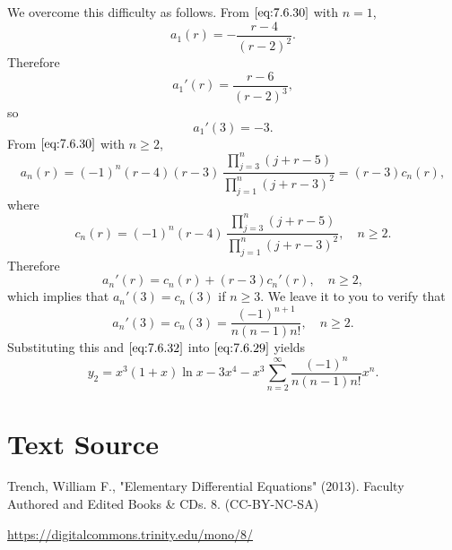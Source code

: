 \documentclass{ximera}
\begin{document}
\begin{example}
\begin{explanation}
We overcome this difficulty as follows. From $\eqref{eq:7.6.30}$ with
$n=1$,
$$
a_1(r)=-\frac{r-4}{(r-2)^2}.
$$
Therefore
$$
a_1'(r)=\frac{r-6}{(r-2)^3},
$$
so
\begin{equation} \label{eq:7.6.32}
a_1'(3)=-3.
\end{equation}
From $\eqref{eq:7.6.30}$ with $n\geq 2$,
$$
a_n(r)=(-1)^n (r-4)(r-3)\,\frac{\prod_{j=3}^n(j+r-5)}{\prod_{j=1}^n(j+r-3)^2}
=(r-3)c_n(r),
$$
where
$$
c_n(r)=(-1)^n(r-4)\,
\frac{\prod_{j=3}^n(j+r-5)}{\prod_{j=1}^n(j+r-3)^2},\quad  n\geq 2.
$$
Therefore
$$
a_n'(r)=c_n(r)+(r-3)c_n'(r),\quad n\geq 2,
$$
which implies that  $a_n'(3)=c_n(3)$ if $n\geq 3$. We leave it to
you to verify that
$$
a_n'(3)=c_n(3)=\frac{(-1)^{n+1}}{n(n-1)n!},\quad n\geq 2.
$$
Substituting this and $\eqref{eq:7.6.32}$ into $\eqref{eq:7.6.29}$
yields
$$
y_2=x^3(1+x)\ln x-3x^4-x^3\sum_{n=2}^\infty \frac{(-1)^n}{n(n-1)n!}x^n.
$$
\end{explanation}
\end{example}

\section*{Text Source}
Trench, William F., "Elementary Differential Equations" (2013). Faculty Authored and Edited Books \& CDs. 8. (CC-BY-NC-SA)

\href{https://digitalcommons.trinity.edu/mono/8/}{https://digitalcommons.trinity.edu/mono/8/}
\end{document}
